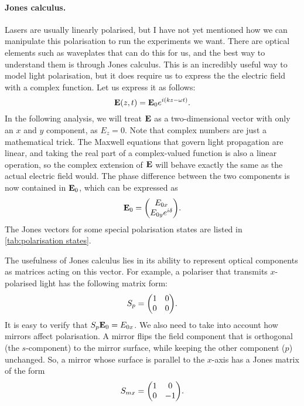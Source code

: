 \paragraph{Jones calculus.} Lasers are usually linearly polarised, but I have not yet mentioned how we can manipulate this polarisation to run the experiments we want. There are optical elements such as waveplates that can do this for us, and the best way to understand them is through Jones calculus. This is an incredibly useful way to model light polarisation, but it does require us to express the the electric field with a complex function. Let us express it as follows:
\begin{equation}
	\vb{E}(z, t) = \vb{E}_0 e^{i(kz-\omega t)}.
	\label{eq:propagator}
\end{equation}
In the following analysis, we will treat $ \vb{E} $ as a two-dimensional vector with only an $ x $ and $ y $ component, as $ E_z = 0 $. Note that complex numbers are just a mathematical trick. The Maxwell equations that govern light propagation are linear, and taking the real part of a complex-valued function is also a linear operation, so the complex extension of $ \vb{E} $ will behave exactly the same as the actual electric field would. The phase difference between the two components is now contained in $ \vb{E}_0 $, which can be expressed as
\begin{equation}
	\vb{E}_0 = \mqty(\Eox \\ \Eoy e^{i\delta} ).
\end{equation}
The Jones vectors for some special polarisation states are listed in \autoref{tab:polarisation states}.

The usefulness of Jones calculus lies in its ability to represent optical components as matrices acting on this vector. For example, a polariser that transmits $ x $-polarised light has the following matrix form:
\begin{equation}
	S_p = \mqty(1 & 0 \\ 0 & 0).
\end{equation}
It is easy to verify that $ S_p \vb{E}_0 = E_{0x} $. We also need to take into account how mirrors affect polarisation. A mirror flips the field component that is orthogonal (the $ s $-component) to the mirror surface, while keeping the other component ($ p $) unchanged. So, a mirror whose surface is parallel to the $ x $-axis has a Jones matrix of the form
\begin{equation}
	S_{mx} = \mqty(1 & 0 \\ 0 & -1).
\end{equation}

